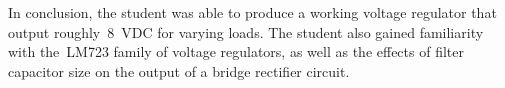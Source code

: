 In conclusion, the student was able to produce a working voltage regulator that
output roughly~\SI{8}{\volt}DC for varying loads.  The student also gained
familiarity with the~LM723 family of voltage regulators, as well as the effects
of filter capacitor size on the output of a bridge rectifier circuit.
